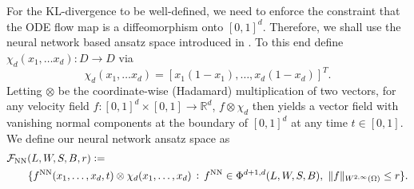For the KL-divergence to be well-defined, we need to enforce the constraint that the ODE flow map is a diffeomorphism onto $[0,1]^d$. Therefore, we shall use the neural network based ansatz space introduced in \cite{StatisticalNODE}.
To this end define $\chi_d(x_1,\dots x_d): D\rightarrow D$ via
$$\chi_d(x_1,\dots x_d) = [x_1(1-x_1),\dots ,x_d(1-x_d)]^T.$$ Letting
$\otimes$ be the coordinate-wise (Hadamard) multiplication of two vectors,
for any velocity field
$f: [0,1]^d\times[0,1]\rightarrow \mathbb{R}^d$,
$f\otimes\chi_d$ then yields a vector field with vanishing
normal components at the boundary of $[0,1]^d$ at any 
time $t\in [0,1]$.  %
We define our neural network ansatz space as
          \begin{align}\label{eq:FNN}
            &\mathcal{F}_{\text{NN}}(L,W, S, B, r) :=\nonumber\\
            &\qquad\set{f^{\text{NN}}(x_1,\ldots, x_d,t)\otimes\chi_d(x_1,\ldots, x_d)}{f^\text{NN}\in\Phi^{d+1,d}(L, W, S, B),~%
              \|f\|_{W^{2,\infty}(\Omega)}\leq r}.
          \end{align}








